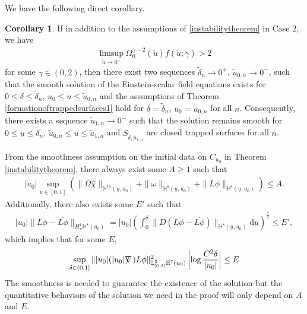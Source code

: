 \documentclass[11pt,reqno]{amsart}
\theoremstyle{definition}
\newtheorem{corollary}{Corollary}[section]
\newtheorem{remark}{Remark}[section]
\numberwithin{equation}{section}
\newcommand{\D}{\mathrm{d}}
\renewcommand{\L}{\mathbb{L}}
\renewcommand{\H}{\mathbb{H}}
\def\chih{\widehat{\chi}}
\def\ub{\underline{u}}
\newcommand{\tdelta}{\widetilde{\delta}}
\newcommand{\tu}{\widetilde{u}}
\def\nablas{\mbox{$\nabla \mkern -13mu /$ }}
\begin{document}
We have the following direct corollary.
\begin{corollary}\label{instabilitycorollary}
If in addition to the assumptions of \ref{instabilitytheorem} in Case 2, we have
\begin{align*}
\limsup_{\tu\to0^-}\Omega_0^{\gamma-2}(\widetilde{u})f(\tu;\gamma)>2
\end{align*}
for some $\gamma\in(0,2)$, then there exist two sequences $\tdelta_n\to0^+$, $\tu_{0,n}\to0^-$, such that the smooth solution of the Einstein-scalar field equations exists for $0\le\delta\le\tdelta_n$, $u_0\le u\le \tu_{0,n}$ and the assumptions of Theorem \ref{formationoftrappedsurfaces1} hold for $\delta=\tdelta_n$, $u_0=\tu_{0,n}$ for all $n$. Consequently, there exists a sequence $\tu_{1,n}\to0^-$ such that the solution remains smooth for $0\le\ub\le\tdelta_n$, $\tu_{0,n}\le u\le \tu_{1,n}$ and $S_{\tdelta,\tu_{1,n}}$ are closed trapped surfaces for all $n$. 

\end{corollary}


From the smoothness assumption on the initial data on $C_{u_0}$ in Theorem \ref{instabilitytheorem}, there always exist some $A\ge1$ such that
\begin{align}\label{conditionA}
|u_0|\sup_{\ub\in[0,1]}\left(\|\Omega\chih\|_{\H^{10}(\ub,u_0)}+\|\omega\|_{\H^8(\ub,u_0)}+\|L\phi\|_{\H^8(\ub,u_0)}\right)\le A.
\end{align}
Additionally, there also exists some $E'$ such that
\begin{align}\label{conditionE'}
|u_0|\|L\phi-\overline{L\phi}\|_{H^1_{\ub}\H^8(u_0)}=|u_0|\left(\int_{0}^{\delta}\|D(L\phi-\overline{L\phi})\|_{\H^8(\ub,u_0)}\D\ub\right)^{\frac{1}{2}}\le E',
\end{align}
which implies that for some $E$,
\begin{align}\label{conditionE}
\sup_{\delta\in(0,1]}\||u_0|(|u_0|\nablas)L\phi\|^2_{\L^2_{[0,\delta]}\H^7(u_0)}\left|\log\frac{C^2\delta}{|u_0|}\right|\le E
\end{align}
The smoothness is needed to guarantee the existence of the solution but the quantitative behaviors of the solution we need in the proof will only depend on $A$ and $E$.
\end{document}
